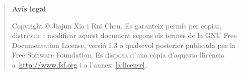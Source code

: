 \pagebreak

\vspace*{16truecm}

	\begin{quote}
	\textbf{Avís legal}

	  Copyright \copyright{}  Jiajun Xia i Rui Chen.
	  Es garanteix permís per copiar, distribuir i modificar aquest document segons els termes de la GNU Free Documentation License, versió 1.3 o qualsevol posterior publicada per la Free Software Foundation. Es disposa d'una còpia d'aquesta llicència a~\href{http://www.fsf.org}{http://www.fsf.org} i a l'annex~\ref{a:license}.
	\end{quote}	





\endinput
